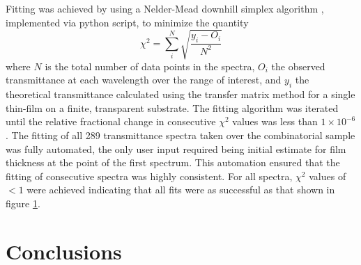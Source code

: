 \documentclass[aps,prl,5p,showpacs,showkeys,twocolumn]{revtex4-1}
\begin{document}
Fitting was achieved by using a Nelder-Mead downhill simplex algorithm \cite{Nelder1965}, implemented via python script, to minimize the quantity
\begin{equation}
\chi^{2} = \sum_{i}^N\sqrt{\frac{y_i - O_i}{N^2}}
\end{equation}\label{eqn:2}
where $N$ is the total number of data points in the spectra, $O_i$ the observed transmittance at each wavelength over the range of interest, and $y_i$ the theoretical transmittance calculated using the transfer matrix method \cite{Macleod1986} for a single thin-film on a finite, transparent substrate.  The fitting algorithm was iterated until the relative fractional change in consecutive $\chi^2$ values was less than $1\times10^{-6}$. The fitting of all 289 transmittance spectra taken over the combinatorial sample was fully automated, the only user input required being initial estimate for film thickness at the point of the first spectrum. This automation ensured that the fitting of consecutive spectra was highly consistent. For all spectra, $\chi^2$ values of $<1$ were achieved indicating that all fits were as successful as that shown in figure \ref{fig:1}.





\section{Conclusions}

\begin{acknowledgements}

\end{acknowledgements}




\begin{figure}[0]
\centering
\caption{\label{fig:1}}
\end{figure}
\end{document}
